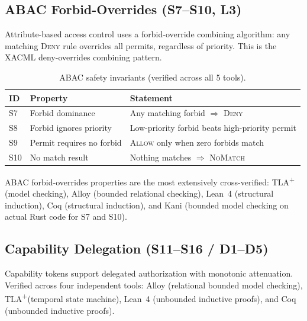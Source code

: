 \documentclass[sigplan,screen,nonacm]{acmart}
\newcommand{\tlaplus}{TLA\textsuperscript{+}\xspace}
\newcommand{\deny}{\textsc{Deny}\xspace}
\newcommand{\allow}{\textsc{Allow}\xspace}
\begin{document}
\subsection{ABAC Forbid-Overrides (S7--S10, L3)}
\label{sec:abac}

Attribute-based access control uses a forbid-override combining algorithm:
any matching \deny rule overrides all permits, regardless of priority.
This is the XACML deny-overrides combining pattern.

\begin{table}[h]
\caption{ABAC safety invariants (verified across all 5 tools).}
\label{tab:abac-safety}
\small
\begin{tabular}{@{}llp{5.2cm}@{}}
\toprule
ID & Property & Statement \\
\midrule
S7 & Forbid dominance & Any matching forbid $\Rightarrow$ \deny \\
S8 & Forbid ignores priority & Low-priority forbid beats high-priority permit \\
S9 & Permit requires no forbid & \allow only when zero forbids match \\
S10 & No match result & Nothing matches $\Rightarrow$ \textsc{NoMatch} \\
\bottomrule
\end{tabular}
\end{table}

ABAC forbid-overrides properties are the most extensively cross-verified:
\tlaplus (model checking), Alloy (bounded relational checking), Lean~4
(structural induction), Coq (structural induction), and Kani (bounded
model checking on actual Rust code for S7 and S10).


\subsection{Capability Delegation (S11--S16 / D1--D5)}
\label{sec:capability}

Capability tokens support delegated authorization with monotonic attenuation.
Verified across four independent tools: Alloy (relational bounded model
checking), \tlaplus (temporal state machine), Lean~4 (unbounded inductive
proofs), and Coq (unbounded inductive proofs).
\end{document}
